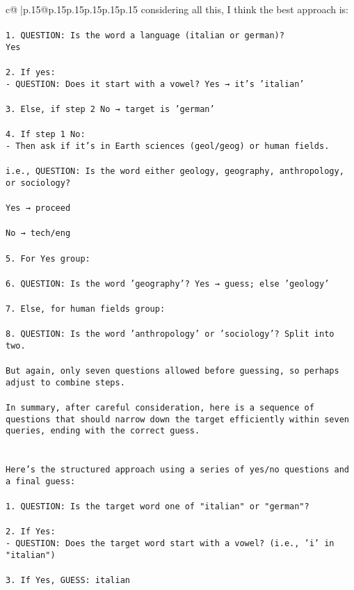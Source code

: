 \documentclass{article}
\begin{document}
{\begin{supertabular}{c@{$\;$}|p{.15\linewidth}@{}p{.15\linewidth}p{.15\linewidth}p{.15\linewidth}p{.15\linewidth}p{.15\linewidth}}
{{{considering all this, I think the best approach is:\\ \tt \\ \tt 1. QUESTION: Is the word a language (italian or german)?\\ \tt    Yes\\ \tt \\ \tt 2. If yes:\\ \tt    - QUESTION: Does it start with a vowel? Yes → it's 'italian'\\ \tt \\ \tt 3. Else, if step 2 No → target is 'german'\\ \tt \\ \tt 4. If step 1 No:\\ \tt    - Then ask if it's in Earth sciences (geol/geog) or human fields.\\ \tt \\ \tt       i.e., QUESTION: Is the word either geology, geography, anthropology, or sociology?\\ \tt \\ \tt    Yes → proceed\\ \tt \\ \tt    No → tech/eng\\ \tt \\ \tt 5. For Yes group:\\ \tt \\ \tt 6. QUESTION: Is the word 'geography'? Yes → guess; else 'geology'\\ \tt \\ \tt 7. Else, for human fields group:\\ \tt \\ \tt 8. QUESTION: Is the word 'anthropology' or 'sociology'? Split into two.\\ \tt \\ \tt But again, only seven questions allowed before guessing, so perhaps adjust to combine steps.\\ \tt \\ \tt In summary, after careful consideration, here is a sequence of questions that should narrow down the target efficiently within seven queries, ending with the correct guess.\\ \tt \\ \tt \\ \tt Here's the structured approach using a series of yes/no questions and a final guess:\\ \tt \\ \tt 1. QUESTION: Is the target word one of "italian" or "german"?\\ \tt \\ \tt 2. If Yes:\\ \tt    - QUESTION: Does the target word start with a vowel? (i.e., 'i' in "italian")\\ \tt \\ \tt 3. If Yes, GUESS: italian\\ \tt }}}
\end{supertabular}}
\end{document}
